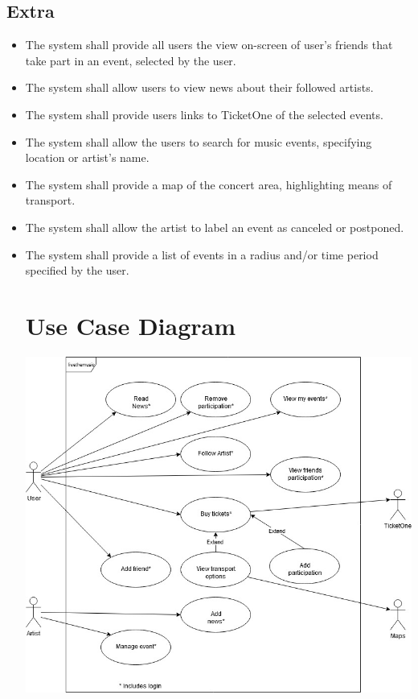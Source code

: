 \documentclass[11pt,a4paper]{article}
\begin{document}
\subsection{Extra}
\begin{itemize}
\item The system shall provide all users the view on-screen of user’s friends that take part in an event, selected by the user.
\item The system shall allow users to view news about their followed artists.
\item The system shall provide users links to TicketOne of the selected events.
\item The system shall allow the users to search for music events, specifying location or artist’s name.
\item The system shall provide a map of the concert area, highlighting means of transport.
\item The system shall allow the artist to label an event as canceled or postponed.
\item The system shall provide a list of events in a radius and/or time period specified by the user.
\section{Use Case Diagram}
\includegraphics[scale=0.7]{UseCaseFinal.jpg}

\end{itemize}
\end{document}
